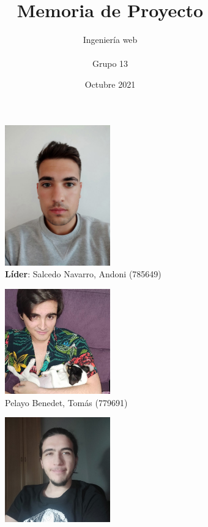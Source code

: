 \documentclass{article}
\title{Memoria de Proyecto}
\author{Ingeniería web\\\\Grupo 13}
\date{Octubre 2021}
\begin{document}
 
\maketitle
 
\begin{figure}[H]
	 \captionsetup[subfigure]{justification=centering}
	  \begin{subfigure}[b]{0.49\textwidth}
		  \centering
			\includegraphics[width=0.5\textwidth]{../images/Andoni.jpeg}
			\caption*{\textbf{Líder}: Salcedo Navarro, Andoni (785649)}
	  \end{subfigure}
	  \hfill
	  \begin{subfigure}[b]{0.49\textwidth}
		  \centering
		  \includegraphics[width=0.5\textwidth]{../images/Tomas.jpeg}
		  \caption*{Pelayo Benedet, Tomás (779691)}
	  \end{subfigure}
	  \hfill
	  \begin{subfigure}[b]{0.49\textwidth}
		  \centering
		  \includegraphics[width=0.5\textwidth]{../images/Ruben.jpeg}

\end{subfigure}
\end{figure}
\end{document}
